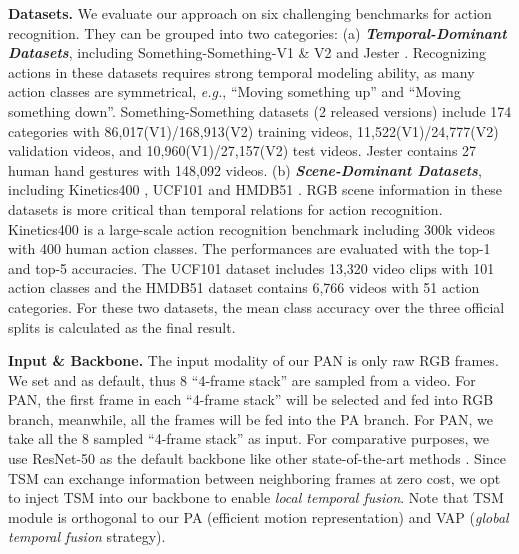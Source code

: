\documentclass[journal]{IEEEtran}
\begin{document}
\textbf{Datasets.} We evaluate our approach on six challenging benchmarks for action recognition. They can be grouped into two categories: (a) \textbf{\emph{Temporal-Dominant Datasets}}, including Something-Something-V1 \& V2 \cite{something} and Jester \cite{Materzynska_2019_ICCV_Workshops}. Recognizing actions in these datasets requires strong temporal modeling ability, as many action classes are symmetrical, \emph{e.g.}, ``Moving something up'' and ``Moving something down''. Something-Something datasets (2 released versions) include 174 categories with 86,017(V1)/168,913(V2) training videos, 11,522(V1)/24,777(V2) validation videos, and 10,960(V1)/27,157(V2) test videos. Jester contains 27 human hand gestures with 148,092 videos. (b) \textbf{\emph{Scene-Dominant Datasets}}, including Kinetics400 \cite{kinetics}, UCF101 \cite{ucf101} and HMDB51 \cite{hmdb51}. RGB scene information in these datasets is more critical than temporal relations for action recognition. Kinetics400 is a large-scale action recognition benchmark including 300k videos with 400 human action classes. The performances are evaluated with the top-1 and top-5 accuracies. The UCF101 dataset includes 13,320 video clips with 101 action classes and the HMDB51 dataset contains 6,766 videos with 51 action categories. For these two datasets, the mean class accuracy over the three official splits is calculated as the final result.

\textbf{Input \& Backbone.} The input modality of our PAN is only raw RGB frames. We set  and  as default, thus 8 ``4-frame stack'' are sampled from a video. For PAN, the first frame in each ``4-frame stack'' will be selected and fed into RGB branch, meanwhile, all the frames will be fed into the PA branch. For PAN, we take all the 8 sampled ``4-frame stack'' as input. For comparative purposes, we use ResNet-50 as the default backbone like other state-of-the-art methods \cite{wang2018videos,lin2019tsm,Feichtenhofer2019SlowFastNF}. Since TSM \cite{lin2019tsm} can exchange information between neighboring frames at zero cost, we opt to inject TSM into our backbone to enable \emph{local temporal fusion}. Note that TSM module is orthogonal to our PA (efficient motion representation) and VAP (\emph{global temporal fusion} strategy).
\end{document}
